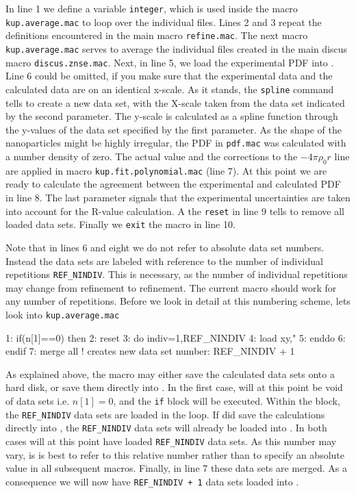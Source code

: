 In line 1 we define a variable {\tt integer}, which is used inside the macro 
{\tt kup.average.mac} to loop over the individual files. Lines 2 and 3 repeat
the definitions encountered in the main macro {\tt refine.mac}. The next
macro {\tt kup.average.mac} serves to average the individual files created
in the main discus macro {\tt discus.znse.mac}. Next, in line 5, we load the
experimental PDF into \Kuplot. Line 6 could be omitted, if you make sure
that the experimental data and the calculated data are on an identical 
x-scale. As it stands, the {\tt spline} command tells \Kuplot to create a
new data set, with the X-scale taken from the data set indicated by the 
second parameter. The y-scale is calculated as a spline function through 
the y-values of the data set specified by the first parameter. 
As the shape of the nanoparticles might be highly irregular, the 
PDF in {\tt pdf.mac} was calculated with a number density of zero. The 
actual value and the corrections to the $-4 \pi \rho_0 r$ line are applied
in macro {\tt kup.fit.polynomial.mac} (line 7). At this point we are 
ready to calculate the agreement between the experimental and calculated
PDF in line 8. The last parameter signals that the experimental uncertainties
are taken into account for the R-value calculation. A the {\tt reset} in line 
9 tells \Kuplot to remove all loaded data sets. Finally we {\tt exit} the 
\Kuplot macro in line 10.

Note that in lines 6 and eight we do not refer to absolute data set numbers.
Instead the data sets are labeled with reference to the number of individual
repetitions {\tt REF\_NINDIV}. This is necessary, as the number of individual
repetitions may change from refinement to refinement. The current macro 
should work for any number of repetitions. Before we look in detail at 
this numbering scheme, lets look into {\tt kup.average.mac}
\begin{MacVerbatim}
1: if(n[1]==0) then
2:   reset
3:   do indiv=1,REF_NINDIV
4:      load xy,"%
5:   enddo 
6: endif
7: merge all    ! creates new data set number: REF_NINDIV + 1
\end{MacVerbatim}

As explained above, the \Discus macro may either save the calculated data 
sets onto a hard disk, or save them directly into \Kuplot. In the first
case, \Kuplot will at this point be void of data sets i.e. $n[1]=0$, and
the {\tt if} block will be executed. Within the block, the {\tt REF\_NINDIV}
data sets are loaded in the loop. If \Discus did save the calculations
directly into \Kuplot, the {\tt REF\_NINDIV} data sets will already be 
loaded into \Kuplot. In both cases \Kuplot will at this point have loaded
{\tt REF\_NINDIV} data sets. As this number may vary, is is best to refer
to this relative number rather than to specify an absolute value in all 
subsequent \Kuplot macros. Finally, in line 7 these data sets are merged.
As a consequence we will now have {\tt REF\_NINDIV + 1} data sets loaded
into \Kuplot.

